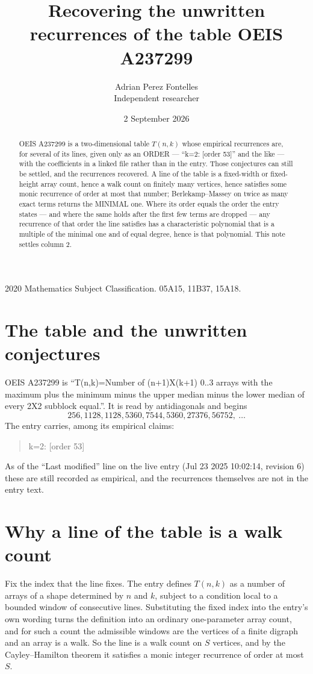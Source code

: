 \documentclass[11pt,a4paper]{article}
\title{Recovering the unwritten recurrences of the table OEIS A237299}
\author{Adrian Perez Fontelles\\ \small Independent researcher}
\date{2 September 2026}
\theoremstyle{plain}
\theoremstyle{definition}
\begin{document}
\maketitle

\begin{abstract}
OEIS A237299 is a two-dimensional table $T(n,k)$ whose empirical recurrences are, for several of
its lines, given only as an ORDER --- ``k=2: [order 53]'' and the like --- with the
coefficients in a linked file rather than in the entry. Those conjectures can still be settled,
and the recurrences recovered. A line of the table is a fixed-width or fixed-height array
count, hence a walk count on finitely many vertices, hence satisfies some monic recurrence of
order at most that number; Berlekamp--Massey on twice as many exact terms returns the MINIMAL
one. Where its order equals the order the entry states --- and where the same holds after the
first few terms are dropped --- any recurrence of that order the line satisfies has a
characteristic polynomial that is a multiple of the minimal one and of equal degree, hence is
that polynomial. This note settles column 2.
\end{abstract}

\noindent\small 2020 Mathematics Subject Classification. 05A15, 11B37, 15A18.\normalsize

\section{The table and the unwritten conjectures}

OEIS A237299 is ``T(n,k)=Number of (n+1)X(k+1) 0..3 arrays with the maximum plus the minimum minus the upper median minus the lower median of every 2X2 subblock equal.''. It is read by antidiagonals and begins
\[
256, 1128, 1128, 5360, 7544, 5360, 27376, 56752,\ \dots
\]
The entry carries, among its empirical claims:
\begin{quote}\small
k=2: [order 53]
\end{quote}
As of the ``Last modified'' line on the live entry (Jul 23 2025 10:02:14, revision 6) these are still
recorded as empirical, and the recurrences themselves are not in the entry text.

\section{Why a line of the table is a walk count}

Fix the index that the line fixes. The entry defines $T(n,k)$ as a number of arrays of a shape
determined by $n$ and $k$, subject to a condition local to a bounded window of consecutive
lines. Substituting the fixed index into the entry's own wording turns the definition into an
ordinary one-parameter array count, and for such a count the admissible windows are the
vertices of a finite digraph and an array is a walk. So the line is a walk count on $S$
vertices, and by the Cayley--Hamilton theorem it satisfies a monic integer recurrence of order
at most $S$.
\end{document}
